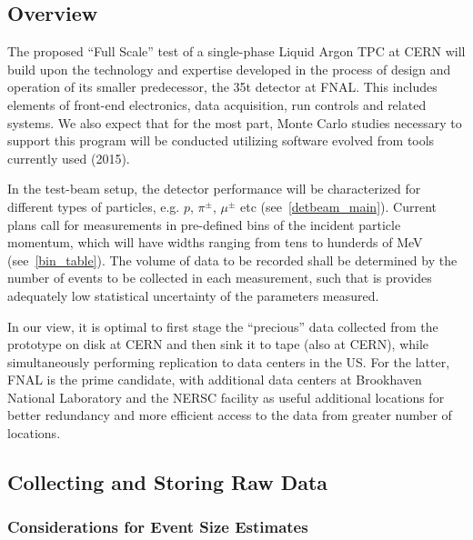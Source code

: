 
\subsection{Overview}
The proposed ``Full Scale'' test of a single-phase Liquid Argon TPC at CERN will build upon the technology and expertise developed in the
process of design and operation of its smaller predecessor, the 35t detector at FNAL.
This includes elements of front-end electronics, data acquisition, run controls and related systems. We also expect that for the most part,
Monte Carlo studies necessary to support this program will be conducted utilizing software evolved from tools currently used (2015).

In the test-beam setup, the detector performance will be characterized for different types of particles, e.g. $p$, $\pi^{\pm}$, $\mu^{\pm}$ etc (see~\ref{detbeam_main}).
Current plans call for measurements in pre-defined bins of the incident particle momentum, which will have widths ranging from tens to
hunderds of MeV (see~\ref{bin_table}). The volume of data to be recorded shall be determined by the number of events to be collected in each measurement, such that is
provides adequately low statistical uncertainty of the parameters measured.

In our view, it is optimal to first stage the ``precious'' data collected from the prototype on disk at CERN and then sink it to tape (also at CERN),
while simultaneously performing replication to data centers in the US. For the latter, FNAL is the prime candidate, with additional data centers at Brookhaven National Laboratory
and the NERSC facility as useful additional locations for better redundancy and more efficient access to the data from greater number of locations.

\subsection{Collecting and Storing Raw Data}

\subsubsection{Considerations for Event Size Estimates}

